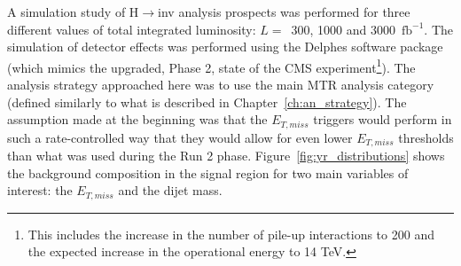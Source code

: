 \hspace{10pt} A simulation study of H$\rightarrow$inv analysis prospects was performed for three different values of total integrated luminosity: $L=$~300, 1000 and 3000~$\text{fb}^{-1}$. The simulation of detector effects was performed using the Delphes software package~\cite{paper:delphes} (which mimics the upgraded, Phase 2, state of the CMS experiment\footnote{This includes the increase in the number of pile-up interactions to 200 and the expected increase in the operational energy to 14 TeV.}). The analysis strategy approached here was to use the main MTR analysis category (defined similarly to what is described in Chapter~\ref{ch:an_strategy}). The assumption made at the beginning was that the $E_{T,miss}$ triggers would perform in such a rate-controlled way that they would allow for even lower $E_{T,miss}$ thresholds than what was used during the Run 2 phase. Figure~\ref{fig:yr_distributions} shows the background composition in the signal region for two main variables of interest: the $E_{T,miss}$ and the dijet mass.


